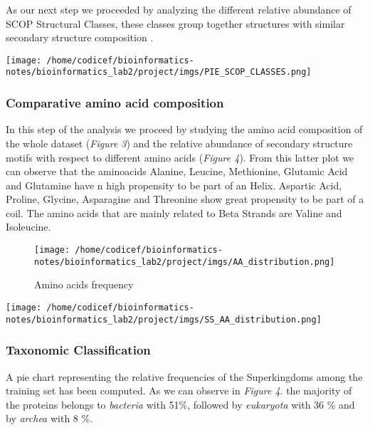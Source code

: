 \documentclass[a4paper,twocolumn]{article}
\begin{document}
As our next step we proceeded by analyzing the different relative abundance of SCOP Structural Classes, these classes group together structures with similar secondary structure composition \cite{scop} .

\begin{center}
\texttt{[image: /home/codicef/bioinformatics-notes/bioinformatics\_lab2/project/imgs/PIE\_SCOP\_CLASSES.png]}
\end{center}

\subsubsection{Comparative amino acid composition}
\label{sec:orgfa031bd}
In this step of the analysis we proceed by studying the amino acid composition of
the whole dataset (\emph{Figure 3}) and the relative abundance of secondary structure motifs with
respect to different amino acids (\emph{Figure 4}).
From this latter plot we can observe that the aminoacids Alanine, Leucine, Methionine, Glutamic Acid and Glutamine have n high propensity to be part of an Helix.
Aspartic Acid, Proline, Glycine, Asparagine and Threonine show great propensity to be part
of a coil. The amino acids that are mainly related to Beta Strands are Valine and Isoleucine.

\begin{figure}[htbp]
\centering
\texttt{[image: /home/codicef/bioinformatics-notes/bioinformatics\_lab2/project/imgs/AA\_distribution.png]}
\caption{Amino acids frequency}
\end{figure}

\begin{center}
\texttt{[image: /home/codicef/bioinformatics-notes/bioinformatics\_lab2/project/imgs/SS\_AA\_distribution.png]}
\end{center}

\subsubsection{Taxonomic Classification}
\label{sec:org2f52f7a}
A pie chart representing the relative frequencies of the Superkingdoms among the training set
has been computed. As we can observe in \emph{Figure 4}. the majority of the proteins belongs to
\emph{bacteria} with 51\%, followed by \emph{eukaryota} with 36 \% and by \emph{archea} with 8 \%.
\end{document}
